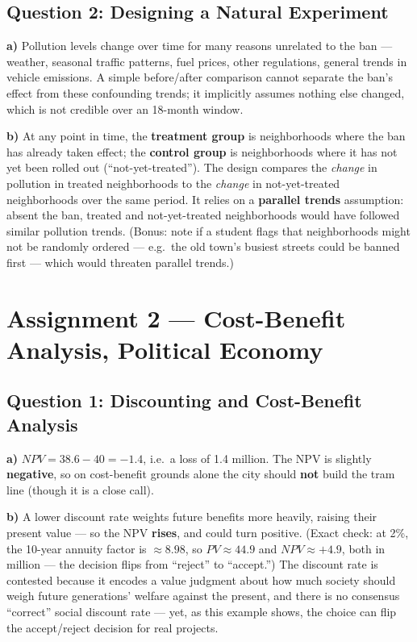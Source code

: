 \documentclass[11pt]{article}
\newcommand{\qpart}[1]{\par\vspace{0.3em}\noindent\textbf{#1}\quad}
\begin{document}
\subsection*{Question 2: Designing a Natural Experiment}

\qpart{a)} Pollution levels change over time for many reasons unrelated to the ban --- weather, seasonal traffic patterns, fuel prices, other regulations, general trends in vehicle emissions. A simple before/after comparison cannot separate the ban's effect from these confounding trends; it implicitly assumes nothing else changed, which is not credible over an 18-month window.

\qpart{b)} At any point in time, the \textbf{treatment group} is neighborhoods where the ban has already taken effect; the \textbf{control group} is neighborhoods where it has not yet been rolled out (``not-yet-treated''). The design compares the \emph{change} in pollution in treated neighborhoods to the \emph{change} in not-yet-treated neighborhoods over the same period. It relies on a \textbf{parallel trends} assumption: absent the ban, treated and not-yet-treated neighborhoods would have followed similar pollution trends. (Bonus: note if a student flags that neighborhoods might not be randomly ordered --- e.g.\ the old town's busiest streets could be banned first --- which would threaten parallel trends.)

\section*{Assignment 2 --- Cost-Benefit Analysis, Political Economy}

\subsection*{Question 1: Discounting and Cost-Benefit Analysis}

\qpart{a)} $NPV = 38.6 - 40 = -1.4$, i.e.\ a loss of \texteuro{}1.4 million. The NPV is slightly \textbf{negative}, so on cost-benefit grounds alone the city should \textbf{not} build the tram line (though it is a close call).

\qpart{b)} A lower discount rate weights future benefits more heavily, raising their present value --- so the NPV \textbf{rises}, and could turn positive. (Exact check: at 2\%, the 10-year annuity factor is $\approx 8.98$, so $PV \approx 44.9$ and $NPV \approx +4.9$, both in \texteuro{} million --- the decision flips from ``reject'' to ``accept.'') The discount rate is contested because it encodes a value judgment about how much society should weigh future generations' welfare against the present, and there is no consensus ``correct'' social discount rate --- yet, as this example shows, the choice can flip the accept/reject decision for real projects.
\end{document}
